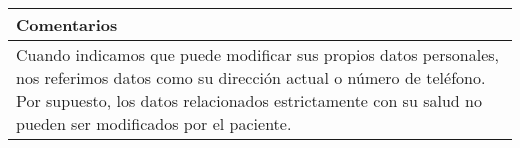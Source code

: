 \documentclass[10pt,a4paper,spanish]{report}
\begin{document}
	\vspace{0.5cm}
	\begin{tabular}{|>{\raggedright}p{337pt}|}
	\hline
	\textbf{Comentarios}\tabularnewline
	\hline
	Cuando indicamos que puede modificar sus propios datos personales, nos referimos datos como su dirección actual o número de teléfono. Por supuesto, los datos relacionados estrictamente con su salud no pueden ser modificados por el paciente.\tabularnewline
	\hline
	\end{tabular}
	
	
	\vspace{2.0cm}
	
	
	
\end{document}
